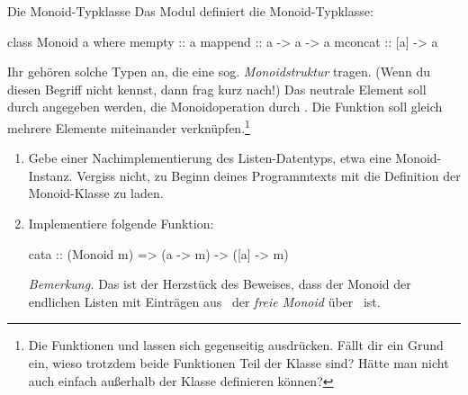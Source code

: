 \documentclass{uebblatt}
\begin{document}
\begin{aufgabe}{Die Monoid-Typklasse}
Das Modul  definiert die Monoid-Typklasse:
\begin{haskellcode}
class Monoid a where
    mempty  :: a
    mappend :: a -> a -> a
    mconcat :: [a] -> a
\end{haskellcode}
Ihr gehören solche Typen an, die eine sog. \emph{Monoidstruktur} tragen. (Wenn
du diesen Begriff nicht kennst, dann frag kurz nach!) Das neutrale Element soll
durch  angegeben werden, die Monoidoperation durch
. Die Funktion  soll gleich
mehrere Elemente miteinander verknüpfen.\footnote{Die Funktionen
 und  lassen sich gegenseitig
ausdrücken. Fällt dir ein Grund ein, wieso trotzdem beide Funktionen Teil der
Klasse sind? Hätte man nicht auch einfach  außerhalb der
Klasse definieren können?}

\begin{enumerate}
\item Gebe einer Nachimplementierung des Listen-Datentyps, etwa
 eine Monoid-Instanz.
Vergiss nicht, zu Beginn deines Programmtexts mit  die Definition der Monoid-Klasse zu laden.
\item Implementiere folgende Funktion:
\begin{haskellcode}
cata :: (Monoid m) => (a -> m) -> ([a] -> m)
\end{haskellcode}
{\scriptsize\emph{Bemerkung.} Das ist der Herzstück des Beweises, dass der Monoid
der endlichen Listen mit Einträgen aus~ der \emph{freie
Monoid} über~ ist.\par}
\end{enumerate}
\end{aufgabe}
\end{document}
